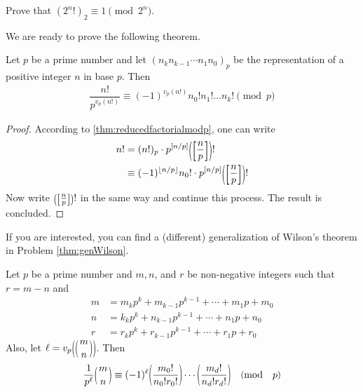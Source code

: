 \documentclass{subfile}
\begin{document}
	\begin{problem}
		Prove that $(2^n!)_2 \equiv 1 \pmod{2^n}$.
	\end{problem}

We are ready to prove the following theorem.

	\begin{theorem}\label{thm:wilsongeneral}
		Let $p$ be a prime number and let $(n_k n_{k-1}\cdots n_1 n_0)_p$ be the representation of a positive integer $n$ in base $p$. Then
			\begin{align}\label{eq:wilsongeneral}
				\dfrac{n!}{p^{v_p(n!)}}\equiv (-1)^{v_p(n!)} n_0!n_1!\dots n_k!\pmod p
			\end{align}
	\end{theorem}

	\begin{proof}
		According to \autoref{thm:reducedfactorialmodp}, one can write
			\begin{align*}
				n!
					& = (n!)_p \cdot p^{\floor{n/p}}\func{}{\floor{\frac{n}{p}}}!\\
					& \equiv (-1)^{\lfloor n/p\rfloor} n_0! \cdot p^{\floor{n/p}}\func{}{\floor{\frac{n}{p}}}!
			\end{align*}
		Now write $\func{}{\floor{\frac np}}!$ in the same way and continue this process. The result is concluded.
	\end{proof}

	\begin{note}
		If you are interested, you can find a (different) generalization of Wilson's theorem in Problem \ref{thm:genWilson}.
	\end{note}
	\begin{theorem}
		Let $p$ be a prime number and $m, n$, and $r$ be non-negative integers such that $r=m-n$ and
			\begin{align*}
				m&=m_kp^k+m_{k-1}p^{k-1}+\cdots +m_1p+m_0\\
				n&=k_kp^k+n_{k-1}p^{k-1}+\cdots +n_1p+n_0\\
				r&=r_kp^k+r_{k-1}p^{k-1}+\cdots +r_1p+r_0
			\end{align*}
		Also, let $\ell = v_{p}\func{}{\binom{m}{n}}$. Then
			\begin{align*}
				\frac1{p^\ell}\binom{m}{n}\equiv (-1)^\ell
				\func{}{\frac{m_0!}{n_0!r_0!}}\cdots \func{}{\frac{m_d!}{n_d!r_d!}}\pmod p
			\end{align*}
	\end{theorem}
\end{document}
